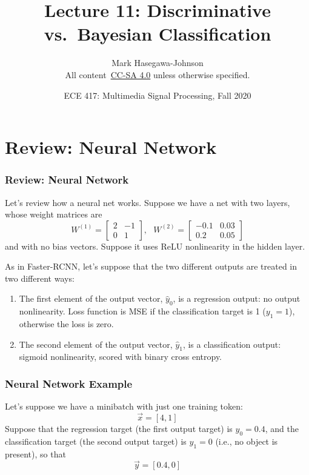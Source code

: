\documentclass{beamer}
\title{Lecture 11: Discriminative vs.~Bayesian Classification}
\author{Mark Hasegawa-Johnson\\All content~\href{https://creativecommons.org/licenses/by-sa/4.0/}{CC-SA 4.0} unless otherwise specified.}
\date{ECE 417: Multimedia Signal Processing, Fall 2020}
\begin{document}
\begin{frame}
  \maketitle
\end{frame}

\begin{frame}
  \tableofcontents
\end{frame}


\section[Review]{Review: Neural Network}
\setcounter{subsection}{1}

\begin{frame}
  \frametitle{Review: Neural Network}
  Let's review how a neural net works.  Suppose we have a net with two
  layers, whose weight matrices are
  \begin{displaymath}
  W^{(1)}=
  \left[
    \begin{array}{cc}
      2&-1\\0&1
    \end{array}
    \right],~~~
  W^{(2)}=
  \left[
    \begin{array}{cc}
      -0.1&0.03\\0.2&0.05
    \end{array}
    \right]
  \end{displaymath}
  and with no bias vectors.  Suppose it uses ReLU nonlinearity in the
  hidden layer.

  As in Faster-RCNN, let's suppose that the two different outputs are
  treated in two different ways:
  \begin{enumerate}
  \item The first element of the output
  vector, $\hat{y}_0$, is a regression output: no output nonlinearity.
  Loss function is MSE if the classification target is 1 ($y_1=1$), otherwise
  the loss is zero.
  \item The second element of the output vector, $\hat{y}_1$, is a
  classification output: sigmoid nonlinearity, scored with binary
  cross entropy.
  \end{enumerate}
\end{frame}

\begin{frame}
  \frametitle{Neural Network Example}
  Let's suppose we have a minibatch with just one training token:
  \begin{displaymath}
    \vec{x}=[4,1]
  \end{displaymath}
  Suppose that the regression target (the first output target) is
  $y_0=0.4$, and the classification target (the second output target)
  is $y_1=0$ (i.e., no object is present), so that
  \begin{displaymath}
    \vec{y}=[0.4,0]
  \end{displaymath}
\end{frame}
\end{document}

